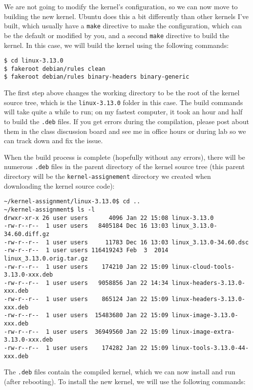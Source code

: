 \documentclass[11pt]{article}
\begin{document}
We are not going to modify the kernel's configuration, so we can now move to building the new kernel. Ubuntu does this a bit differently than other kernels I've built, which usually have a \texttt{make} directive to make the configuration, which can be the default or modified by you, and a second \texttt{make} directive to build the kernel. In this case, we will build the kernel using the following commands:

\begin{verbatim}
$ cd linux-3.13.0
$ fakeroot debian/rules clean
$ fakeroot debian/rules binary-headers binary-generic
\end{verbatim}

The first step above changes the working directory to be the root of the kernel source tree, which is the \texttt{linux-3.13.0} folder in this case. The build commands will take quite a while to run; on my fastest computer, it took an hour and half to build the \texttt{.deb} files. If you get errors during the compilation, please post about them in the class discussion board and see me in office hours or during lab so we can track down and fix the issue.

When the build process is complete (hopefully without any errors), there will be numerous \texttt{.deb} files in the parent directory of the kernel source tree (this parent directory will be the \texttt{kernel-assignement} directory we created when downloading the kernel source code):

\begin{verbatim}
~/kernel-assignment/linux-3.13.0$ cd ..
~/kernel-assignment$ ls -l
drwxr-xr-x 26 user users      4096 Jan 22 15:08 linux-3.13.0
-rw-r--r--  1 user users   8405184 Dec 16 13:03 linux_3.13.0-34.60.diff.gz
-rw-r--r--  1 user users     11783 Dec 16 13:03 linux_3.13.0-34.60.dsc
-rw-r--r--  1 user users 116419243 Feb  3  2014 linux_3.13.0.orig.tar.gz
-rw-r--r--  1 user users    174210 Jan 22 15:09 linux-cloud-tools-3.13.0-xxx.deb
-rw-r--r--  1 user users   9058856 Jan 22 14:34 linux-headers-3.13.0-xxx.deb
-rw-r--r--  1 user users    865124 Jan 22 15:09 linux-headers-3.13.0-xxx.deb
-rw-r--r--  1 user users  15483680 Jan 22 15:09 linux-image-3.13.0-xxx.deb
-rw-r--r--  1 user users  36949560 Jan 22 15:09 linux-image-extra-3.13.0-xxx.deb
-rw-r--r--  1 user users    174282 Jan 22 15:09 linux-tools-3.13.0-44-xxx.deb
\end{verbatim}

The \texttt{.deb} files contain the compiled kernel, which we can now install and run (after rebooting). To install the new kernel, we will use the following commands:
\end{document}
